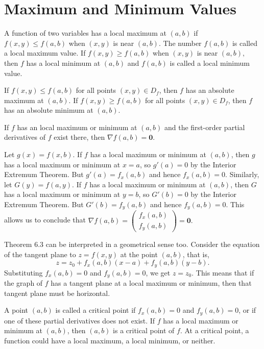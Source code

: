 \documentclass{article}
\begin{document}
\section{Maximum and Minimum Values}
\begin{definition}
    A function of two variables has a local maximum at $(a,b)$ if $f(x,y)\leq f(a,b)$ when $(x,y)$ is near $(a,b)$. The number $f(a,b)$ is called a local maximum value. If $f(x,y)\geq f(a,b)$ when $(x,y)$ is near $(a,b),$ then $f$ has a local minimum at $(a,b)$ and $f(a,b)$ is called a local minimum value.
\end{definition}
\begin{definition}
    If $f(x,y)\leq f(a,b)$ for all points $(x,y)\in D_f$, then $f$ has an absolute maximum at $(a,b).$  If $f(x,y)\geq f(a,b)$ for all points $(x,y)\in D_f$, then $f$ has an absolute minimum at $(a,b).$
\end{definition}
\begin{theorem}
    If $f$ has an local maximum or minimum at $(a,b)$ and the first-order partial derivatives of $f$ exist there, then $\nabla f(a,b)=\bm{0}.$
\end{theorem}
\begin{replacementproof}
    Let $g(x)=f(x,b).$ If $f$ has a local maximum or minimum at $(a,b)$, then $g$ has a local maximum or minimum at $x=a$, so $g'(a)=0$ by the Interior Extremum Theorem. But $g'(a)=f_x(a,b)$ and hence $f_x(a,b)=0.$ Similarly, let $G(y)=f(a,y).$ If $f$ has a local maximum or minimum at $(a,b)$, then $G$ has a local maximum or minimum at $y=b$, so $G'(b)=0$ by the Interior Extremum Theorem. But $G'(b)=f_y(a,b)$ and hence $f_y(a,b)=0.$ This allows us to conclude that $\nabla f(a,b)=\begin{pmatrix}
        f_x(a,b)\\
        f_y(a,b)
    \end{pmatrix}=\bm{0}.$
\end{replacementproof}
Theorem 6.3 can be interpreted in a geometrical sense too. Consider the equation of the tangent plane to $z=f(x,y)$ at the point $(a,b)$, that is,
$$z=z_0+f_x(a,b)(x-a)+f_y(a,b)(y-b).$$
Substituting $f_x(a,b)=0$ and $f_y(a,b)=0$, we get $z=z_0.$ This means that if the graph of $f$ has a tangent plane at a local maximum or minimum, then that tangent plane must be horizontal.
\begin{definition}
    A point $(a,b)$ is called a critical point if $f_x(a,b)=0$ and $f_y(a,b)=0$, or if one of these partial derivatives does not exist. If $f$ has a local maximum or minimum at $(a,b)$, then $(a,b)$ is a critical point of $f$. At a critical point, a function could have a local maximum, a local minimum, or neither.
\end{definition}
\end{document}
